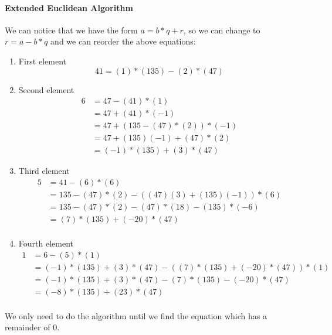 \documentclass[titlepage, 12pt]{article}
\numberwithin{equation}{section}%
\numberwithin{figure}{section}%
\numberwithin{table}{section}%
\begin{document}
		\paragraph*{Extended Euclidean Algorithm}
		We can notice that we have the form $a = b*q + r$, so we can change to $r = a - b*q$ and we can reorder the above equations:
		\begin{enumerate}
			\item First element
			\begin{equation}
				41 = (1)*(135) - (2)*(47)
			\end{equation}
			\item Second element
			\begin{equation}
			\begin{split}
			6 &= 47 - (41)*(1)\\
			&= 47 + (41)*(-1)\\
			&= 47 + (135 - (47)*(2))*(-1)\\
			&= 47 + (135)(-1) + (47)*(2)\\
			&= (-1)*(135) + (3)*(47)
			\end{split}
			\end{equation}
			\item Third element
			\begin{equation}
				\begin{split}
				5 &= 41 - (6)*(6) \\
				&= 135 - (47)*(2) - ((47)(3) + (135)(-1))*(6) \\
				&= 135 - (47)*(2) - (47)*(18) - (135)*(-6)\\
				&= (7)*(135) + (-20)*(47)  \\
				\end{split}
			\end{equation}
			\item Fourth element
			\begin{equation}
				\begin{split}
				1 &= 6 - (5)*(1)\\ 
				&= (-1)*(135) + (3)*(47) - ((7)*(135) + (-20)*(47))*(1)\\ 
				&= (-1)*(135) + (3)*(47) - (7)*(135) - (-20)*(47)\\ 
				&= (-8)*(135) + (23)*(47)\\
				\end{split} 
			\end{equation}
		\end{enumerate}
		
		We only need to do the algorithm until we find the equation which has a remainder of 0. \bigskip
		
\end{document}
